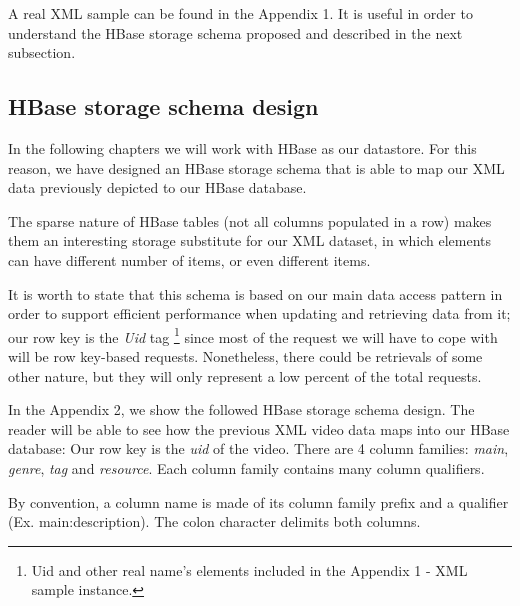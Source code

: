 \bigskip

A real XML sample can be found in the Appendix 1. It is useful in order to understand the HBase storage schema proposed and described in the next subsection.

\subsection{HBase storage schema design}

In the following chapters we will work with HBase as our datastore. For this reason, we have designed an HBase storage schema that is able to map our XML data previously depicted to our HBase database. 

\par
The sparse nature of HBase tables (not all columns populated in a row) makes them an interesting storage substitute for our XML dataset, in which elements can have different number of items, or even different items.

\par
It is worth to state that this schema is based on our main data access pattern in order to support efficient performance when updating and retrieving data from it; our row key is the \textit{Uid} tag \footnote{Uid and other real name's elements included in the Appendix 1 -  XML sample instance.} since most of the request we will have to cope with will be row key-based requests. Nonetheless, there could be retrievals of some other nature, but they will only represent a low percent of the total requests.
\bigskip

In the Appendix 2, we show the followed HBase storage schema design. The reader will be able to see how the previous XML video data maps into our HBase database: Our row key is the \textit{uid} of the video. There are 4 column families: \textit{main}, \textit{genre}, \textit{tag} and \textit{resource}. Each column family contains many column qualifiers.
\par
By convention, a column name is made of its column family prefix and a qualifier (Ex. main:description). The colon character delimits both columns.



